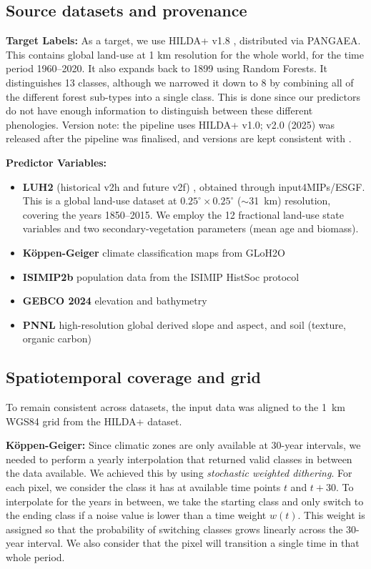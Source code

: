 \documentclass[gmd, manuscript]{copernicus}
\begin{document}
\subsection{Source datasets and provenance}

\textbf{Target Labels:} As a target, we use HILDA+ v1.8 \citep{winkler2020hilda+}, distributed via PANGAEA. This contains global land-use at 1 km resolution for the whole world, for the time period 1960--2020. It also expands back to 1899 using Random Forests. It distinguishes 13 classes, although we narrowed it down to 8 by combining all of the different forest sub-types into a single class. This is done since our predictors do not have enough information to distinguish between these different phenologies.
Version note: the pipeline uses HILDA+ v1.0; v2.0 (2025) was released after the pipeline was finalised, and versions are kept consistent with \citet{mozaffari2026scalable}.

\textbf{Predictor Variables:}
\begin{itemize}
    \item \textbf{LUH2} (historical v2h and future v2f) \citep{hurtt2020harmonization}, obtained through input4MIPs/ESGF. This is a global land-use dataset at $0.25^{\circ} \times 0.25^{\circ}$ ($\sim$31~km) resolution, covering the years 1850--2015. We employ the 12 fractional land-use state variables and two secondary-vegetation parameters (mean age and biomass).
    \item \textbf{Köppen-Geiger} climate classification maps \citep{beck2018present, beck2023high} from GLoH2O
    \item \textbf{ISIMIP2b} population data from the ISIMIP HistSoc protocol \citep{frieler2017assessing}
    \item \textbf{GEBCO 2024} elevation and bathymetry \citep{GEBCO2024}
    \item \textbf{PNNL} \citep{li2024global} high-resolution global derived slope and aspect, and soil (texture, organic carbon)
\end{itemize}


\subsection{Spatiotemporal coverage and grid}
To remain consistent across datasets, the input data was aligned to the 1~km WGS84 grid from the HILDA+ dataset.

\textbf{Köppen-Geiger:} Since climatic zones are only available at 30-year intervals, we needed to perform a yearly interpolation that returned valid classes in between the data available. We achieved this by using \textit{stochastic weighted dithering}. For each pixel, we consider the class it has at available time points $t$ and $t+30$. To interpolate for the years in between, we take the starting class and only switch to the ending class if a noise value is lower than a time weight $w(t)$. This weight is assigned so that the probability of switching classes grows linearly across the 30-year interval. We also consider that the pixel will transition a single time in that whole period.
\end{document}

